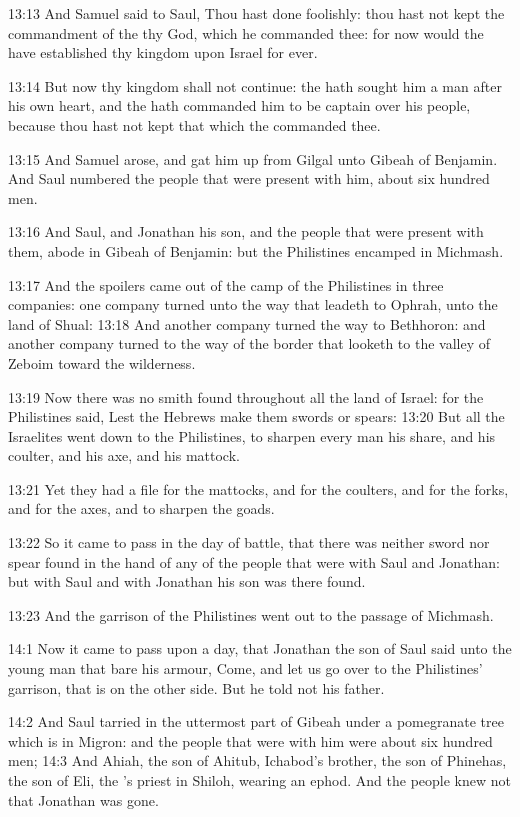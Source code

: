 13:13 And Samuel said to Saul, Thou hast done foolishly: thou hast not
kept the commandment of the \LORD thy God, which he commanded thee: for
now would the \LORD have established thy kingdom upon Israel for ever.

13:14 But now thy kingdom shall not continue: the \LORD hath sought him
a man after his own heart, and the \LORD hath commanded him to be
captain over his people, because thou hast not kept that which the
\LORD commanded thee.

13:15 And Samuel arose, and gat him up from Gilgal unto Gibeah of
Benjamin. And Saul numbered the people that were present with him,
about six hundred men.

13:16 And Saul, and Jonathan his son, and the people that were present
with them, abode in Gibeah of Benjamin: but the Philistines encamped
in Michmash.

13:17 And the spoilers came out of the camp of the Philistines in
three companies: one company turned unto the way that leadeth to
Ophrah, unto the land of Shual: 13:18 And another company turned the
way to Bethhoron: and another company turned to the way of the border
that looketh to the valley of Zeboim toward the wilderness.

13:19 Now there was no smith found throughout all the land of Israel:
for the Philistines said, Lest the Hebrews make them swords or spears:
13:20 But all the Israelites went down to the Philistines, to sharpen
every man his share, and his coulter, and his axe, and his mattock.

13:21 Yet they had a file for the mattocks, and for the coulters, and
for the forks, and for the axes, and to sharpen the goads.

13:22 So it came to pass in the day of battle, that there was neither
sword nor spear found in the hand of any of the people that were with
Saul and Jonathan: but with Saul and with Jonathan his son was there
found.

13:23 And the garrison of the Philistines went out to the passage of
Michmash.

14:1 Now it came to pass upon a day, that Jonathan the son of Saul
said unto the young man that bare his armour, Come, and let us go over
to the Philistines' garrison, that is on the other side. But he told
not his father.

14:2 And Saul tarried in the uttermost part of Gibeah under a
pomegranate tree which is in Migron: and the people that were with him
were about six hundred men; 14:3 And Ahiah, the son of Ahitub,
Ichabod's brother, the son of Phinehas, the son of Eli, the \LORD's
priest in Shiloh, wearing an ephod. And the people knew not that
Jonathan was gone.

